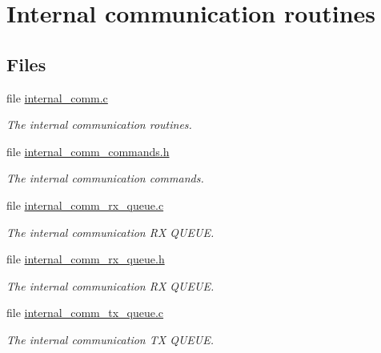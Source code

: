 \hypertarget{group__internal__comm__group}{
\section{Internal communication routines}
\label{group__internal__comm__group}
}
\subsection*{Files}
\begin{CompactItemize}
\item 
file \hyperlink{internal__comm_8c}{internal\_\-comm.c}
\begin{CompactList}\small\item\em The internal communication routines. \item\end{CompactList}

\item 
file \hyperlink{internal__comm__commands_8h}{internal\_\-comm\_\-commands.h}
\begin{CompactList}\small\item\em The internal communication commands. \item\end{CompactList}

\item 
file \hyperlink{internal__comm__rx__queue_8c}{internal\_\-comm\_\-rx\_\-queue.c}
\begin{CompactList}\small\item\em The internal communication RX QUEUE. \item\end{CompactList}

\item 
file \hyperlink{internal__comm__rx__queue_8h}{internal\_\-comm\_\-rx\_\-queue.h}
\begin{CompactList}\small\item\em The internal communication RX QUEUE. \item\end{CompactList}

\item 
file \hyperlink{internal__comm__tx__queue_8c}{internal\_\-comm\_\-tx\_\-queue.c}
\begin{CompactList}\small\item\em The internal communication TX QUEUE. \item\end{CompactList}

\end{CompactItemize}



